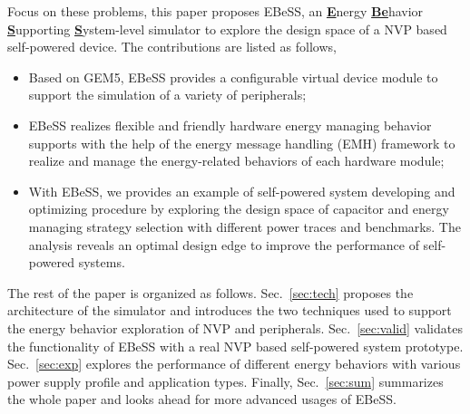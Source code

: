 %
Focus on these problems, this paper proposes EBeSS, an \underline{\textbf{E}}nergy \underline{\textbf{Be}}havior \underline{\textbf{S}}upporting \underline{\textbf{S}}ystem-level simulator to explore the design space of a NVP based self-powered device.
The contributions are listed as follows,
\begin{itemize}
	\item Based on GEM5, EBeSS provides a configurable virtual device module to support the simulation of a variety of peripherals; 

     \item EBeSS realizes flexible and friendly hardware energy managing behavior supports with the help of the energy message handling (EMH) framework to realize and manage  the energy-related behaviors of each hardware module; 

	\item With EBeSS, we provides an example of self-powered system developing and optimizing procedure by exploring the design space of capacitor and energy managing strategy selection with different power traces and benchmarks. The analysis reveals an optimal design edge to improve the performance of self-powered systems.
\end{itemize}

The rest of the paper is organized as follows.
Sec.~\ref{sec:tech} proposes the architecture of the simulator and introduces the two techniques used to support the energy behavior exploration of NVP and peripherals.
Sec.~\ref{sec:valid} validates the functionality of EBeSS with a real NVP based self-powered system prototype.
Sec.~\ref{sec:exp} explores the performance of different energy behaviors with various power supply profile and application types.
Finally, Sec.~\ref{sec:sum} summarizes the whole paper and looks ahead for more advanced usages of EBeSS.

\begin{comment}
  
  
\end{comment}